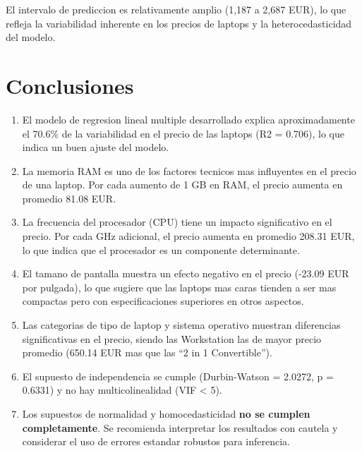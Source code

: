 \documentclass[12pt,a4paper]{article}
\begin{document}
El intervalo de prediccion es relativamente amplio (1,187 a 2,687 EUR), lo que refleja la variabilidad inherente en los precios de laptops y la heterocedasticidad del modelo.

\section{Conclusiones}

\begin{enumerate}[leftmargin=1.5cm]
    \item El modelo de regresion lineal multiple desarrollado explica aproximadamente el 70.6\% de la variabilidad en el precio de las laptops (R2 = 0.706), lo que indica un buen ajuste del modelo.
    
    \item La memoria RAM es uno de los factores tecnicos mas influyentes en el precio de una laptop. Por cada aumento de 1 GB en RAM, el precio aumenta en promedio 81.08 EUR.
    
    \item La frecuencia del procesador (CPU) tiene un impacto significativo en el precio. Por cada GHz adicional, el precio aumenta en promedio 208.31 EUR, lo que indica que el procesador es un componente determinante.
    
    \item El tamano de pantalla muestra un efecto negativo en el precio (-23.09 EUR por pulgada), lo que sugiere que las laptops mas caras tienden a ser mas compactas pero con especificaciones superiores en otros aspectos.
    
    \item Las categorias de tipo de laptop y sistema operativo muestran diferencias significativas en el precio, siendo las Workstation las de mayor precio promedio (650.14 EUR mas que las ``2 in 1 Convertible'').
    
    \item El supuesto de independencia se cumple (Durbin-Watson = 2.0272, p = 0.6331) y no hay multicolinealidad (VIF \textless{} 5).
    
    \item Los supuestos de normalidad y homocedasticidad \textbf{no se cumplen completamente}. Se recomienda interpretar los resultados con cautela y considerar el uso de errores estandar robustos para inferencia.
\end{enumerate}
\end{document}
